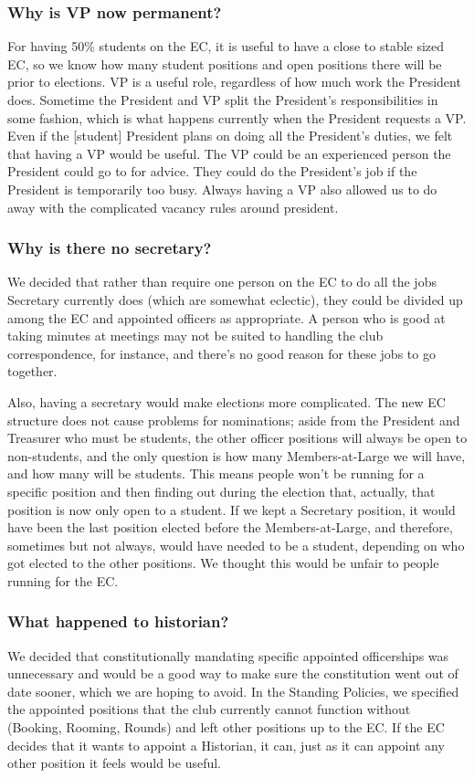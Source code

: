 \documentclass{article}
\begin{document}
\subsubsection*{Why is VP now permanent?}
For having 50\% students on the EC, it is useful to have a close to stable sized EC, so we know how many student positions and open positions there will be prior to elections. VP is a useful role, regardless of how much work the President does. Sometime the President and VP split the President's responsibilities in some fashion, which is what happens currently when the President requests a VP. Even if the [student] President plans on doing all the President's duties, we felt that having a  VP would be useful. The VP could be an experienced person the President could go to for advice. They could do the President's job if the President is temporarily too busy. Always having a VP also allowed us to do away with the complicated vacancy rules around president.

\subsubsection*{Why is there no secretary?}
We decided that rather than require one person on the EC to do all the jobs Secretary currently does (which are somewhat eclectic), they could be divided up among the EC and appointed officers as appropriate. A person who is good at taking minutes at meetings may not be suited to handling the club correspondence, for instance, and there's no good reason for these jobs to go together.

Also, having a secretary would make elections more complicated. The new EC structure does not cause problems for nominations; aside from the President and Treasurer who must be students, the other officer positions will always be open to non-students, and the only question is how many Members-at-Large we will have, and how many will be students. This means people won't be running for a specific position and then finding out during the election that, actually, that position is now only open to a student. If we kept a Secretary position, it would have been the last position elected before the Members-at-Large, and therefore, sometimes but not always, would have needed to be a student, depending on who got elected to the other positions. We thought this would be unfair to people running for the EC.

\subsubsection*{What happened to historian?}
We decided that constitutionally mandating specific appointed officerships was unnecessary and would be a good way to make sure the constitution went out of date sooner, which we are hoping to avoid. In the Standing Policies, we specified the appointed positions that the club currently cannot function without (Booking, Rooming, Rounds) and left other positions up to the EC. If the EC decides that it wants to appoint a Historian, it can, just as it can appoint any other position it feels would be useful.
\end{document}
